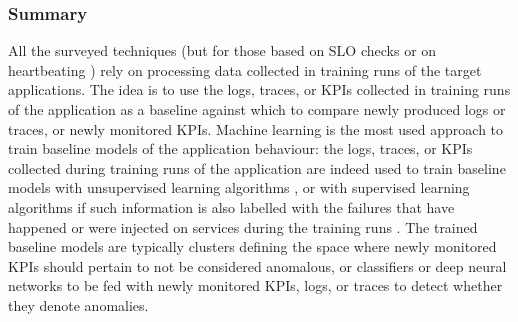 \subsubsection{Summary}
\label{sec:detection:discussion:summary}
All the surveyed techniques (but for those based on SLO checks \cite{40_Chen2020_CauseInfer,48_Chen2014_CauseInfer,19_Guan2019_MicroscopeDemo,06_Lin2018_Microscope,49_Shan2019_epsilonDiagnosis} or on heartbeating \cite{24_Zang2018_FaultDiagnosisMicroservices}) rely on processing data collected in training runs of the target applications. %
The idea is to use the logs, traces, or KPIs collected in training runs of the application as a baseline against which to compare newly produced logs or traces, or newly monitored KPIs.
Machine learning is the most used approach to train baseline models of the application behaviour: the logs, traces, or KPIs collected during training runs of the application are indeed used to train baseline models with unsupervised learning algorithms
\cite{37_Gulenko2018_DetectingAnomalousBehaviourBlackBoxServices,31_Jia2017_AnomalyDiagnosisHybridGraphModel,32_Jia2017_LogSed,22_Jin2020_AnomalyDetectionMicroservicesRPCA,16_Liu2020_TraceAnomaly,13_Mariani2018_LocalizingFaultsCloudSystems,38_Nandi2016_AnomalyDetectionControlFlowGraphMining,35_Nedelkoski2019_AnomalyDetectionTracingData,28_Pitakrat2016_Hora,27_Pitakrat2018_HoraExtended,14_Samir2019_DLA,29_Wang2018_CloudRanger,04_Wu2020_MicroRCA,09_Wu2020_MicroserviceDiagnosisDeepLearning}, or with supervised learning algorithms if such information is also labelled with the failures that have happened or were injected on services during the training runs \cite{36_Bogatinovski2020_SelfSupervisedAnomalyDetection,15_Du2018_AnomalyDetectionContainerMicroservices,02_Zhou2019_LatentErrorPrediction,34_Nedelkoski2019_AnomalyDetectionDistributedTracing,33_Mariani2020_PredictingFailures,17_Gan2019_Seer}.
The trained baseline models are typically clusters defining the space where newly monitored KPIs should pertain to not be considered anomalous, or classifiers  or deep neural networks to be fed with newly monitored KPIs, logs, or traces to detect whether they denote anomalies.

